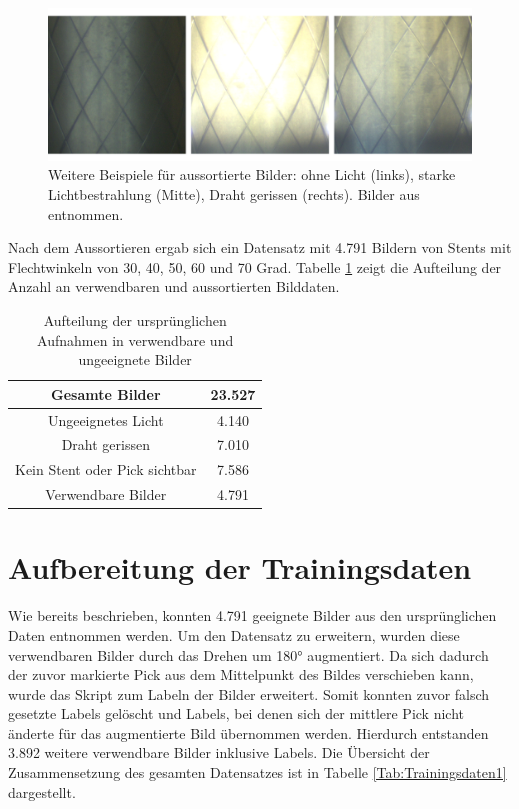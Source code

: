 \begin{figure}[h!]
\centering
\includegraphics[width=12cm]{98_images/datensatz_bsp2.png}
\caption{Weitere Beispiele für aussortierte Bilder: ohne Licht (links), starke Lichtbestrahlung (Mitte), Draht gerissen (rechts). Bilder aus \cite{flechtmaschine} entnommen.}
\label{fig:datensatz-fehler-2}
\end{figure}

\mypar Nach dem Aussortieren ergab sich ein Datensatz mit 4.791 Bildern von Stents mit Flechtwinkeln von 30, 40, 50, 60 und 70 Grad. Tabelle \ref{Tab:Datensatz1} zeigt die Aufteilung der Anzahl an verwendbaren und aussortierten Bilddaten.

\begin{table}[h!]
\begin{center}
\begin{tabular}{cc}
Gesamte Bilder                & 23.527 \\ \hline
Ungeeignetes Licht            & 4.140  \\
Draht gerissen                & 7.010  \\
Kein Stent oder Pick sichtbar & 7.586  \\ \hline
Verwendbare Bilder            & 4.791 
\end{tabular}
\caption{Aufteilung der ursprünglichen Aufnahmen in verwendbare und ungeeignete Bilder}
\label{Tab:Datensatz1}
\end{center}
\end{table}

\section{Aufbereitung der Trainingsdaten}
Wie bereits beschrieben, konnten 4.791 geeignete Bilder aus den ursprünglichen Daten entnommen werden. Um den Datensatz zu erweitern, wurden diese verwendbaren Bilder durch das Drehen um 180° augmentiert. Da sich dadurch der zuvor markierte Pick aus dem Mittelpunkt des Bildes verschieben kann, wurde das Skript zum Labeln der Bilder erweitert. Somit konnten zuvor falsch gesetzte Labels gelöscht und Labels, bei denen sich der mittlere Pick nicht änderte für das augmentierte Bild übernommen werden. Hierdurch entstanden 3.892 weitere verwendbare Bilder inklusive Labels. Die Übersicht der Zusammensetzung des gesamten Datensatzes ist in Tabelle \ref{Tab:Trainingsdaten1} dargestellt.


